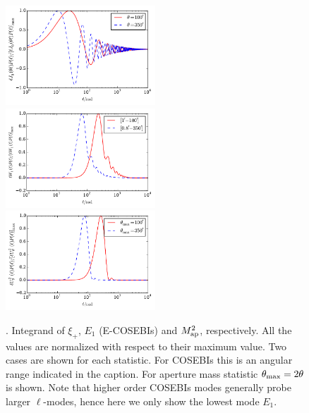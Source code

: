 \begin{figure}[htb]
\begin{center}
\includegraphics[width=0.5\textwidth]{figures/IntegKsip.pdf}\\
\includegraphics[width=0.5\textwidth]{figures/IntegCOSEBIs.pdf}\\
\includegraphics[width=0.5\textwidth]{figures/IntegMap.pdf}
\caption{ \label{fig:filters}. Integrand of $\xi_+$, $E_1$ (E-COSEBIs) and $M^2_{\rm ap}$, respectively.
All the values are normalized with respect to their maximum value. Two cases are shown for each statistic. 
For COSEBIs this is an angular range indicated in the caption. For aperture mass statistic $\theta_{\rm max}=2\theta$ is shown.
Note that higher order COSEBIs modes generally probe larger $\ell$-modes, hence here we only show the lowest mode $E_1$. 
}
\end{center}
\end{figure}


